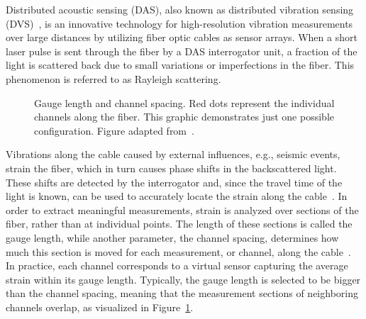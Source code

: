 Distributed acoustic sensing (DAS), also known as distributed vibration sensing (DVS)~\cite{DAS}, is an innovative technology for high-resolution vibration measurements over large distances by utilizing fiber optic cables as sensor arrays.
When a short laser pulse is sent through the fiber by a DAS interrogator unit, a fraction of the light is scattered back due to small variations or imperfections in the fiber.
This phenomenon is referred to as Rayleigh scattering.
\begin{figure}
    \centering

    \caption{
        Gauge length and channel spacing.
        Red dots represent the individual channels along the fiber.
        This graphic demonstrates just one possible configuration.
        Figure adapted from~\cite{GaugeLength}.
    }\label{fig:gauge-length}
\end{figure}
Vibrations along the cable caused by external influences, e.g., seismic events, strain the fiber, which in turn causes phase shifts in the backscattered light.
These shifts are detected by the interrogator and, since the travel time of the light is known, can be used to accurately locate the strain along the cable~\cite{DAS-N2N}.
In order to extract meaningful measurements, strain is analyzed over sections of the fiber, rather than at individual points.
The length of these sections is called the gauge length, while another parameter, the channel spacing, determines how much this section is moved for each measurement, or channel, along the cable~\cite{GaugeLength}.
In practice, each channel corresponds to a virtual sensor capturing the average strain within its gauge length.
Typically, the gauge length is selected to be bigger than the channel spacing, meaning that the measurement sections of neighboring channels overlap, as visualized in Figure~\ref{fig:gauge-length}.
